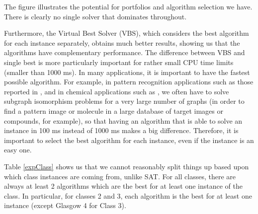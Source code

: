 \documentclass{llncs}
\begin{document}
The figure illustrates the potential for portfolios and algorithm selection we have. There is clearly no single solver that dominates throughout.

Furthermore, the Virtual Best Solver (VBS), which considers the best algorithm for each instance
separately, obtains much better results, showing us that the algorithms have complementary
performance. The difference between VBS and single best is more particularly important for rather
small CPU time limits (smaller than 1000 ms). In many applications, it is important to have the
fastest possible algorithm. For example, in pattern recognition applications such as those reported
in \cite{pr15,cviu11}, and in chemical applications such as \cite{Giugno:2013}, we often have to
solve subgraph isomorphism problems for a very large number of graphs (in order to find a pattern
image or molecule in a large database of target images or compounds, for example), so that having an
algorithm that is able to solve an instance in 100 ms instead of 1000 ms makes a big difference.
Therefore, it is important to select the best algorithm for each instance, even if the instance is
an easy one.

Table \ref{expClass} shows us that we cannot reasonably split things up based upon which class instances are coming from, unlike SAT. For all classes, there are always at least 2 algorithms which are the best for at least one instance of the class. In particular, for classes 2 and 3, each algorithm is the best for at least one instance (except Glasgow 4 for Class 3).
\end{document}

